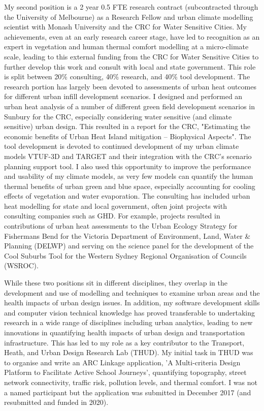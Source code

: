 My second position is a 2 year 0.5 FTE research contract (subcontracted through the University of Melbourne) as a Research Fellow and urban climate modelling scientist with Monash University and the CRC for Water Sensitive Cities. My achievements, even at an early research career stage, have led to recognition as an expert in vegetation and human thermal comfort modelling at a micro-climate scale, leading to this external funding from the CRC for Water Sensitive Cities to further develop this work and consult with local and state government. This role is split between 20\% consulting, 40\% research, and 40\% tool development. The research portion has largely been devoted to assessments of urban heat outcomes for different urban infill development scenarios. I designed and performed an urban heat analysis of a number of different green field development scenarios in Sunbury for the CRC, especially considering water sensitive (and climate sensitive) urban design. This resulted in a report for the CRC, "Estimating the economic benefits of Urban Heat Island mitigation – Biophysical Aspects"\footnotemark {}. The tool development is devoted to continued development of my urban climate models VTUF-3D and TARGET and their integration with the CRC's scenario planning support tool. I also used this opportunity to improve the performance and usability of my climate models, as very few models can quantify the human thermal benefits of urban green and blue space, especially accounting for cooling effects of vegetation and water evaporation. The consulting has included urban heat modelling for state and local government, often joint projects with consulting companies such as GHD. For example, projects resulted in contributions of urban heat assessments to the Urban Ecology Strategy for Fishermans Bend for the Victoria Department of Environment, Land, Water \& Planning (DELWP) and serving on the science panel for the development of the Cool Suburbs Tool for the Western Sydney Regional Organisation of Councils (WSROC). 

While these two positions sit in different disciplines, they overlap in the development and use of modelling and techniques to examine urban areas and the health impacts of urban design issues. In addition, my software development skills and computer vision technical knowledge has proved transferable to undertaking research in a wide range of disciplines including urban analytics, leading to new innovations in quantifying health impacts of urban design and transportation infrastructure. This has led to my role as a key contributor to the Transport, Heath, and Urban Design Research Lab (THUD). My initial task in THUD was to organise and write an ARC Linkage application, 'A Multi-criteria Design Platform to Facilitate Active School Journeys', quantifying topography, street network connectivity, traffic risk, pollution levels, and thermal comfort. I was not a named participant but the application was submitted in December 2017 (and resubmitted and funded in 2020). 

